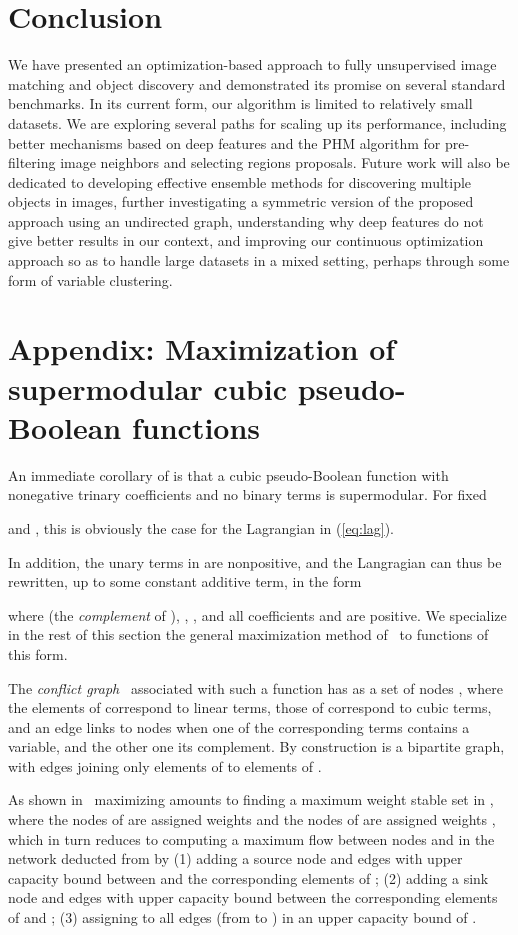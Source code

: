 \documentclass[10pt,twocolumn,letterpaper]{article}
\numberwithin{theorem}{section}
\begin{document}
\section{Conclusion}
We have presented an optimization-based approach to fully unsupervised image
matching and object discovery and demonstrated its promise on several standard benchmarks. In its current form, our algorithm is limited to relatively small datasets. We are exploring several paths for scaling up its performance, including better mechanisms based on deep features and the PHM algorithm for pre-filtering image neighbors and selecting regions proposals. Future work will also be dedicated to developing effective ensemble methods for discovering multiple objects in images, further investigating a symmetric version of the proposed approach using an undirected graph, understanding why deep features do not give better results in our context, and improving our continuous optimization approach so as to handle large datasets in a mixed setting, perhaps through some form of variable clustering.
\vspace{-2mm} \section*{Appendix: Maximization of supermodular cubic pseudo-Boolean functions} 
An immediate corollary of \cite[Lemma 1]{BiMi85} is
that a cubic pseudo-Boolean function with nonegative trinary coefficients
and no binary terms is supermodular.  For fixed 

and , this is obviously the case for the Lagrangian  in (\ref{eq:lag}).

In addition, the unary terms in  are nonpositive, and the Langragian
can thus be rewritten, up to some constant additive term, in the form

where  (the {\em complement} of ),
, , and all
coefficients  and  are positive.  We specialize in the
rest of this section the general maximization method of~\cite{BiMi85}
to functions of this form.

The {\em conflict graph}~\cite{BiMi85,BoHa02}  associated with
such a function  has as a set of nodes , where the
elements of  correspond to linear terms, those of  correspond to
cubic terms, and an edge links to nodes when one of the corresponding
terms contains a variable, and the other one its complement. By
construction  is a bipartite graph, with edges joining only
elements of  to elements of .

As shown in~\cite{BiMi85} maximizing  amounts to finding a maximum
weight stable set in , where the nodes of  are assigned
weights  and the nodes of  are assigned weights ,
which in turn reduces to computing a maximum flow between nodes 
and  in the network deducted from  by (1) adding a source
node and edges with upper capacity bound  between  and the
corresponding elements of ; (2) adding a sink node  and edges
with upper capacity bound  between the corresponding elements
of  and ; (3) assigning to all edges (from  to ) in 
an upper capacity bound of .
\end{document}
